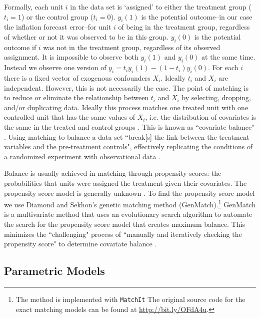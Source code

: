 \documentclass[a4paper]{article}
\begin{document}
Formally, each unit $i$ in the data set is `assigned' to either the treatment group ($t_{i} = 1$) or the control group ($t_{i} = 0$). $y_{i}(1)$ is the potential outcome--in our case the inflation forecast error--for unit $i$ of being in the treatment group, regardless of whether or not it was observed to be in this group. $y_{i}(0)$ is the potential outcome if $i$ was not in the treatment group, regardless of its observed assignment. It is impossible to observe both $y_{i}(1)$ and $y_{i}(0)$ at the same time. Instead we observe one version of $y_{i}=t_{i}y_{i}(1)-(1-t_{i})y_i(0)$. For each $i$ there is a fixed vector of exogenous confounders $X_{i}$. Ideally $t_{i}$ and $X_{i}$ are independent. However, this is not necessarily the case. The point of matching is to reduce or eliminate the relationship between $t_{i}$  and $X_{i}$ by selecting, dropping, and/or duplicating data. Ideally this process matches one treated unit with one controlled unit that has the same values of $X_{i}$, i.e. the distribution of covariates is the same in the treated and control groups \citep{matchit2011}. This is known as ``covariate balance" \cite[1]{Diamond2012}. Using matching to balance a data set ``break[s] the link between the treatment variables and the pre-treatment controls", effectively replicating the conditions of a randomized experiment with observational data \cite[][2--3]{matchit2011}. 

Balance is usually achieved in matching through propensity scores: the probabilities that units were assigned the treatment given their covariates. The propensity score model is generally unknown \citep{Drake1993}. To find the propensity score model we use Diamond and Sekhon's \citeyearpar{Diamond2012} genetic matching method (GenMatch).\footnote{The method is implemented with {\tt{MatchIt}} The original source code for the exact matching models can be found at {\url{http://bit.ly/OFdA4u}}.} GenMatch is a multivariate method that uses an evolutionary search algorithm to automate the search for the propensity score model that creates maximum balance. This minimizes the ``challenging" process of ``manually and iteratively checking the propensity score" to determine covariate balance \citep[][2]{Diamond2012}. 


\subsection{Parametric Models}
\end{document}
